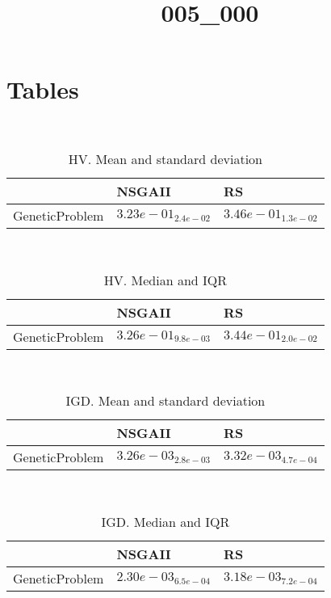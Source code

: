 \documentclass{article}
\title{005_000}
\author{}
\begin{document}
\maketitle
\section{Tables}
\
\begin{table}
\caption{HV. Mean and standard deviation}
\label{table:mean.HV}
\centering
\begin{scriptsize}
\begin{tabular}{lll}
\hline & NSGAII &  RS\\
\hline
GeneticProblem & \cellcolor{gray25}$  3.23e-01_{ 2.4e-02}$ & \cellcolor{gray95}$  3.46e-01_{ 1.3e-02}$ \\
\hline
\end{tabular}
\end{scriptsize}
\end{table}
\
\begin{table}
\caption{HV. Median and IQR}
\label{table:median.HV}
\begin{scriptsize}
\centering
\begin{tabular}{lll}
\hline & NSGAII &  RS\\
\hline
GeneticProblem & \cellcolor{gray25}$  3.26e-01_{ 9.8e-03}$ & \cellcolor{gray95}$  3.44e-01_{ 2.0e-02}$ \\
\hline
\end{tabular}
\end{scriptsize}
\end{table}
\
\begin{table}
\caption{IGD. Mean and standard deviation}
\label{table:mean.IGD}
\centering
\begin{scriptsize}
\begin{tabular}{lll}
\hline & NSGAII &  RS\\
\hline
GeneticProblem & \cellcolor{gray95}$  3.26e-03_{ 2.8e-03}$ & $  3.32e-03_{ 4.7e-04}$ \\
\hline
\end{tabular}
\end{scriptsize}
\end{table}
\
\begin{table}
\caption{IGD. Median and IQR}
\label{table:median.IGD}
\begin{scriptsize}
\centering
\begin{tabular}{lll}
\hline & NSGAII &  RS\\
\hline
GeneticProblem & \cellcolor{gray95}$  2.30e-03_{ 6.5e-04}$ & $  3.18e-03_{ 7.2e-04}$ \\
\hline
\end{tabular}
\end{scriptsize}
\end{table}
\end{document}
